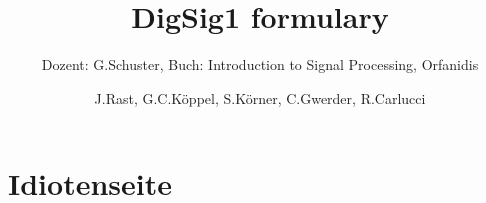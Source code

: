 \documentclass{scrartcl}
\title{DigSig1 formulary}
\subtitle{Dozent: G.Schuster, Buch: Introduction to Signal Processing, Orfanidis}
\author{J.Rast, G.C.Köppel, S.Körner, C.Gwerder, R.Carlucci}
\begin{document}
\begin{titlepage}
	\maketitle
	\thispagestyle{empty}
\end{titlepage}
\newpage

\tableofcontents
\newpage


\newpage







\newpage
\section{Idiotenseite}



\vspace{0.5cm}

\begin{minipage}[t]{0.49\textwidth}
	
\end{minipage}
\hfill
\begin{minipage}[t]{0.49\textwidth}
	
\end{minipage}

\vspace{0.5cm}

\begin{minipage}[t]{0.49\textwidth}
	
\end{minipage}
\hfill
\begin{minipage}[t]{0.49\textwidth}
	
\end{minipage}

\vspace{0.5cm}



\small
\end{document}
